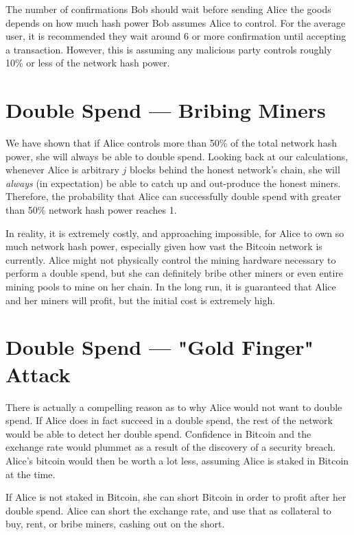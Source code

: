 \documentclass[11pt]{article}
\begin{document}
    The number of confirmations Bob should wait before sending Alice the goods depends on how much hash power Bob assumes Alice to control. For the average user, it is recommended they wait around 6 or more confirmation until accepting a transaction. However, this is assuming any malicious party controls roughly 10\% or less of the network hash power. 
    
    \section*{Double Spend --- Bribing Miners}
    
    We have shown that if Alice controls more than 50\% of the total network hash power, she will always be able to double spend. Looking back at our calculations, whenever Alice is arbitrary $j$ blocks behind the honest network's chain, she will \textit{always} (in expectation) be able to catch up and out-produce the honest miners. Therefore, the probability that Alice can successfully double spend with greater than 50\% network hash power reaches 1.
    
    In reality, it is extremely costly, and approaching impossible, for Alice to own so much network hash power, especially given how vast the Bitcoin network is currently. Alice might not physically control the mining hardware necessary to perform a double spend, but she can definitely bribe other miners or even entire mining pools to mine on her chain. In the long run, it is guaranteed that Alice and her miners will profit, but the initial cost is extremely high.
    
    \section*{Double Spend --- "Gold Finger" Attack}
    
    There is actually a compelling reason as to why Alice would not want to double spend. If Alice does in fact succeed in a double spend, the rest of the network would be able to detect her double spend. Confidence in Bitcoin and the exchange rate would plummet as a result of the discovery of a security breach. Alice's bitcoin would then be worth a lot less, assuming Alice is staked in Bitcoin at the time. 
    
    If Alice is not staked in Bitcoin, she can short Bitcoin in order to profit after her double spend. Alice can short the exchange rate, and use that as collateral to buy, rent, or bribe miners, cashing out on the short.
    
\end{document}
